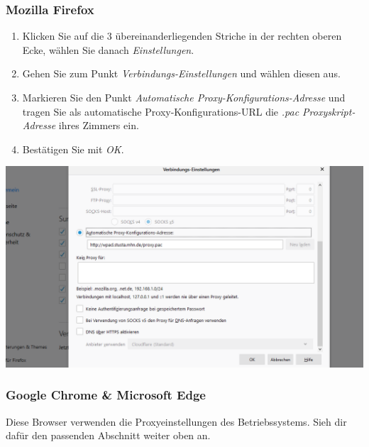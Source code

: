 \documentclass[a4paper,12pt]{scrartcl}
\begin{document}
\subsubsection{Mozilla Firefox}

\begin{minipage}{0.57\textwidth}
\begin{enumerate}
	\item Klicken Sie auf die 3 übereinanderliegenden Striche in der rechten oberen Ecke, wählen Sie danach \emph{Einstellungen}.
	\item Gehen Sie zum Punkt \emph{Verbindungs-Einstellungen} und wählen diesen aus.
	\item Markieren Sie den Punkt \emph{Automatische Proxy-Konfigurations-Adresse} und tragen Sie als automatische Proxy-Konfigurations-URL die \textit{.pac Proxyskript-Adresse} ihres Zimmers ein.
	\item Bestätigen Sie mit \textit{OK}.
\end{enumerate}
\end{minipage}
\hfill
\begin{minipage}{0.4\textwidth}
\centering
\includegraphics[width=\linewidth,keepaspectratio]{Bilder/Firefox_neu_proxy}
\end{minipage}

\subsubsection*{Google Chrome \& Microsoft Edge}
Diese Browser verwenden die Proxyeinstellungen des Betriebssystems.
Sieh dir dafür den passenden Abschnitt weiter oben an.
\end{document}
